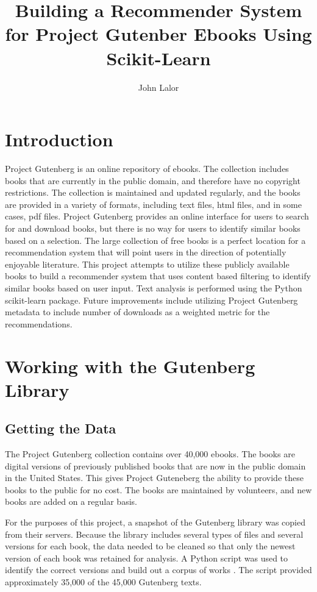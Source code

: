 \documentclass[10pt]{report}
\begin{document}
\title{Building a Recommender System for Project Gutenber Ebooks Using Scikit-Learn}
\author{John Lalor}

\maketitle

\section*{Introduction}
Project Gutenberg is an online repository of ebooks. The collection includes books that are currently in the public domain, and therefore have no copyright restrictions. The collection is maintained and updated regularly, and the books are provided in a variety of formats, including text files, html files, and in some cases, pdf files. Project Gutenberg provides an online interface for users to search for and download books, but there is no way for users to identify similar books based on a selection. The large collection of free books is a perfect location for a recommendation system that will point users in the direction of potentially enjoyable literature. This project attempts to utilize these publicly available books to build a recommender system that uses content based filtering to identify similar books based on user input. Text analysis is performed using the Python scikit-learn package. Future improvements include utilizing Project Gutenberg metadata to include number of downloads as a weighted metric for the recommendations.

\section*{Working with the Gutenberg Library}
\subsection*{Getting the Data}
The Project Gutenberg collection contains over 40,000 ebooks. The books are digital versions of previously published books that are now in the public domain in the United States. This gives Project Guteneberg the ability to provide these books to the public for no cost. The books are maintained by volunteers, and new books are added on a regular basis.

For the purposes of this project, a snapshot of the Gutenberg library was copied from their servers. Because the library includes several types of files and several versions for each book, the data needed to be cleaned so that only the newest version of each book was retained for analysis. A Python script was used to identify the correct versions and build out a corpus of works \cite{python}. The script provided approximately 35,000 of the 45,000 Gutenberg texts. 
\end{document}
